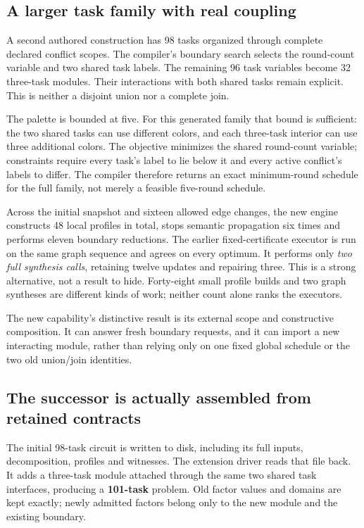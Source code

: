 \documentclass[11pt,letterpaper]{article}
\theoremstyle{definition}\newtheorem{definition}[theorem]{Definition}
\theoremstyle{remark}\newtheorem{remark}[theorem]{Remark}
\begin{document}
\subsection{A larger task family with real coupling}
A second authored construction has 98 tasks organized through complete declared conflict scopes. The compiler's boundary search selects the round-count variable and two shared task labels. The remaining 96 task variables become 32 three-task modules. Their interactions with both shared tasks remain explicit. This is neither a disjoint union nor a complete join.

The palette is bounded at five. For this generated family that bound is sufficient: the two shared tasks can use different colors, and each three-task interior can use three additional colors. The objective minimizes the shared round-count variable; constraints require every task's label to lie below it and every active conflict's labels to differ. The compiler therefore returns an exact minimum-round schedule for the full family, not merely a feasible five-round schedule.

Across the initial snapshot and sixteen allowed edge changes, the new engine constructs 48 local profiles in total, stops semantic propagation six times and performs eleven boundary reductions. The earlier fixed-certificate executor is run on the same graph sequence and agrees on every optimum. It performs only \emph{two full synthesis calls}, retaining twelve updates and repairing three. This is a strong alternative, not a result to hide. Forty-eight small profile builds and two graph syntheses are different kinds of work; neither count alone ranks the executors.

The new capability's distinctive result is its external scope and constructive composition. It can answer fresh boundary requests, and it can import a new interacting module, rather than relying only on one fixed global schedule or the two old union/join identities.

\subsection{The successor is actually assembled from retained contracts}
The initial 98-task circuit is written to disk, including its full inputs, decomposition, profiles and witnesses. The extension driver reads that file back. It adds a three-task module attached through the same two shared task interfaces, producing a \textbf{101-task} problem. Old factor values and domains are kept exactly; newly admitted factors belong only to the new module and the existing boundary.
\end{document}
